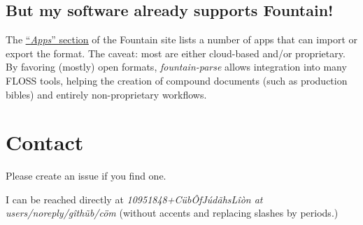 \documentclass[12pt]{article}
\newcommand{\link}[2]{\underline{\color{darkblue}\href{#1}{#2}}}
\begin{document}
\subsection*{But my software already supports Fountain!}
The \link{https://fountain.io/apps/}{``\emph{Apps}''
section} of the Fountain site lists a number of apps that can
import or export the format. The caveat: most are either
cloud-based and/or proprietary. By favoring (mostly) open formats,
\emph{fountain-parse} allows integration into many FLOSS tools,
helping the creation of compound documents (such as production
bibles) and entirely non-proprietary workflows.

\section*{Contact}
Please create an issue if you find one.

I can be reached directly at
\emph{\textsf{10951848+C\"{u}b\^{O}fJ\'{u}d\~{a}hsL\^{i}\`{o}n}
at \textsf{users/noreply/g\^{i}th\~{u}b/c\"{o}m}} (without accents and
replacing slashes by periods.)
\end{document}
